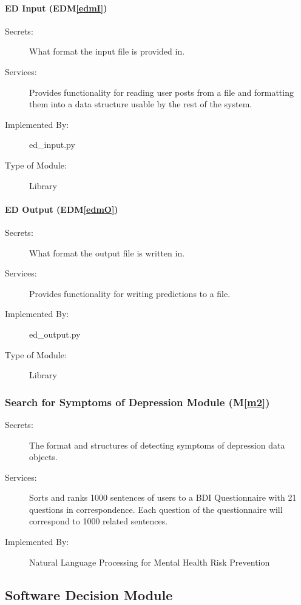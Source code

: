 \documentclass[12pt, titlepage]{article}
\newcommand{\mref}[1]{M\ref{#1}}
\newcommand{\edmref}[1]{EDM\ref{#1}}
\begin{document}
\paragraph{ED Input (\edmref{edmI})}
\begin{description}
\item[Secrets:]What format the input file is provided in.
\item[Services:] Provides functionality for reading user posts from a file and formatting them into a data structure usable by the rest of the system.
\item[Implemented By:] ed\_input.py
\item[Type of Module:] Library
\end{description}

\paragraph{ED Output (\edmref{edmO})}
\begin{description}
\item[Secrets:]What format the output file is written in.
\item[Services:] Provides functionality for writing predictions to a file.
\item[Implemented By:] ed\_output.py
\item[Type of Module:] Library
\end{description}

\subsubsection{Search for Symptoms of Depression Module (\mref{m2})}
\begin{description}
\item[Secrets:]The format and structures of detecting symptoms of depression data objects.
\item[Services:] Sorts and ranks 1000 sentences of users to a BDI Questionnaire with 21 questions in correspondence. Each question of the questionnaire will correspond to 1000 related sentences.
\item[Implemented By:] Natural Language Processing for Mental Health Risk Prevention
\end{description}


\subsection{Software Decision Module}
\end{document}
